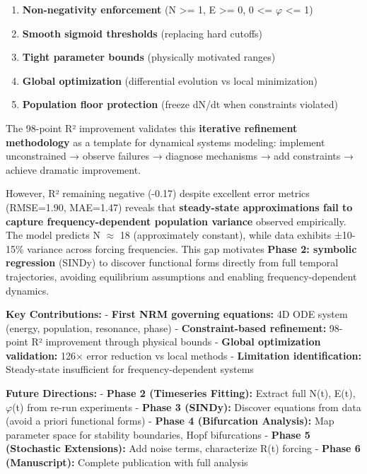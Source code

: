 \documentclass[
]{article}
\providecommand{\tightlist}{%
  \setlength{\itemsep}{0pt}\setlength{\parskip}{0pt}}
\begin{document}
\begin{enumerate}
\def\labelenumi{\arabic{enumi}.}
\tightlist
\item
  \textbf{Non-negativity enforcement} (N \textgreater= 1, E
  \textgreater= 0, 0 \textless= $\varphi$ \textless= 1)
\item
  \textbf{Smooth sigmoid thresholds} (replacing hard cutoffs)
\item
  \textbf{Tight parameter bounds} (physically motivated ranges)
\item
  \textbf{Global optimization} (differential evolution vs local
  minimization)
\item
  \textbf{Population floor protection} (freeze dN/dt when constraints
  violated)
\end{enumerate}

The 98-point R² improvement validates this \textbf{iterative refinement
methodology} as a template for dynamical systems modeling: implement
unconstrained → observe failures → diagnose mechanisms → add constraints
→ achieve dramatic improvement.

However, R² remaining negative (-0.17) despite excellent error metrics
(RMSE=1.90, MAE=1.47) reveals that \textbf{steady-state approximations
fail to capture frequency-dependent population variance} observed
empirically. The model predicts N $\approx$ 18 (approximately constant), while
data exhibits ±10-15\% variance across forcing frequencies. This gap
motivates \textbf{Phase 2: symbolic regression} (SINDy) to discover
functional forms directly from full temporal trajectories, avoiding
equilibrium assumptions and enabling frequency-dependent dynamics.

\textbf{Key Contributions:} - \textbf{First NRM governing equations:} 4D
ODE system (energy, population, resonance, phase) -
\textbf{Constraint-based refinement:} 98-point R² improvement through
physical bounds - \textbf{Global optimization validation:} 126× error
reduction vs local methods - \textbf{Limitation identification:}
Steady-state insufficient for frequency-dependent systems

\textbf{Future Directions:} - \textbf{Phase 2 (Timeseries Fitting):}
Extract full N(t), E(t), $\varphi$(t) from re-run experiments - \textbf{Phase 3
(SINDy):} Discover equations from data (avoid a priori functional forms)
- \textbf{Phase 4 (Bifurcation Analysis):} Map parameter space for
stability boundaries, Hopf bifurcations - \textbf{Phase 5 (Stochastic
Extensions):} Add noise terms, characterize R(t) forcing - \textbf{Phase
6 (Manuscript):} Complete publication with full analysis
\end{document}

